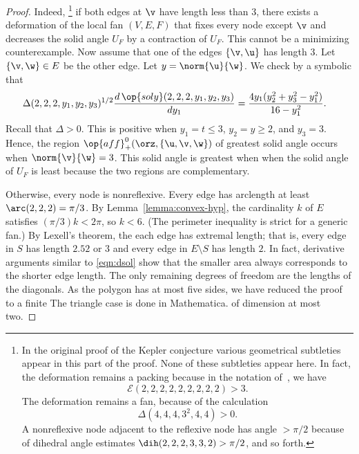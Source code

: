 \begin{proof}
  Indeed,%
\footnote{In the original proof of the Kepler conjecture 
  various geometrical subtleties appear in this part of the
  proof.  None of these subtleties appear here.  In fact, the
  deformation remains a packing because in the notation of~\cite{Hales:2006:DCG},
 we have
\[
{\mathcal E}(2,2,2,2,2,2,2,2,2)> 3.
\]
The deformation remains a fan, because of the calculation
\[
\Delta(4,4,4,3^2,4,4)>0.
\]
A nonreflexive node adjacent to the reflexive node has angle $>\pi/2$
because of dihedral angle estimates $\dih(2,2,2,3,3,2)>\pi/2$, and
so forth.  } 
if both edges at $\v$ have length less than $3$, there
exists a deformation of the local fan $(V,E,F)$ that fixes every node
except $\v$ and decreases the solid angle $U_F$ by a contraction of $U_F$.  
This cannot be a
minimizing counterexample.  Now assume that one of the edges
$\{\v,\u\}$ has length $3$.  Let $\{\v,\w\}\in E$ be the other edge.
Let
$y=\norm{\u}{\w}$.  We check by a symbolic
 that
\begin{align}\label{eqn:dsol}
\Delta(2,2,2,y_1,y_2,y_3)^{1/2}\dfrac{d\,\op{soly}(2,2,2,y_1,y_2,y_3)}{dy_1} &= 
\dfrac{4 y_1 (y_2^2 + y_3^2- y_1^2)}{16- y_1^2}.
\end{align}
 Recall that $\Delta>0$.
This is positive
when $y_1=t\le3$, $y_2=y\ge 2$, and $y_3=3$. 
Hence, the region
$\op{aff}^0_+(\orz,\{\u,\v,\w\})$ of greatest
solid angle occurs when $\norm{\v}{\w}=3$.  This solid angle is greatest when
when the solid angle of $U_F$ is least because  the two regions are complementary.


  Otherwise,
every node is nonreflexive.  Every edge has arclength at least
$\arc(2,2,2)=\pi/3$.  By Lemma~\ref{lemma:convex-hyp}, the cardinality
$k$ of $E$ satisfies $(\pi/3)k < 2\pi$, so $k<6$.  (The perimeter inequality is
strict for a generic fan.)  By Lexell's theorem, the each edge has
extremal length;  that is, every edge in $S$ has length $2.52$ or
$3$ and every edge in $E\setminus S$ has length $2$.  In fact, derivative
arguments similar to \eqref{eqn:dsol} show that the smaller area always
corresponds to the shorter edge length.  The only
remaining degrees of freedom are the lengths of the diagonals.  As the
polygon has at most five sides, we have reduced the proof  to a
finite  %
{The triangle case is done in Mathematica.} of dimension at
most two.


\end{proof}

